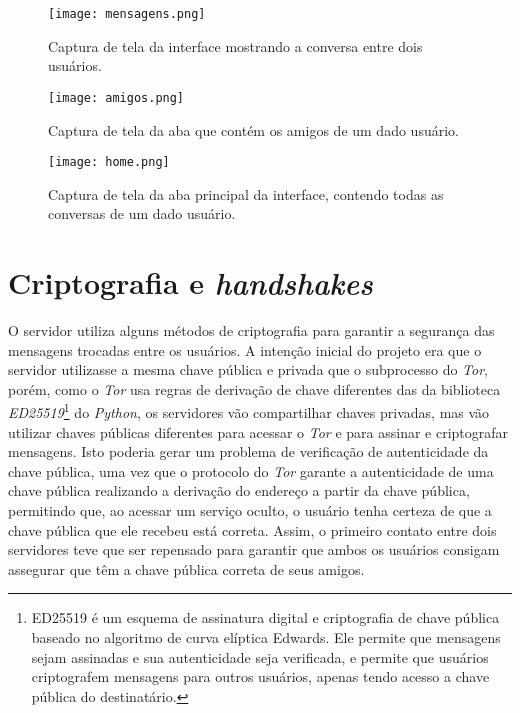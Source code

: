 \begin{figure}[H]
    \centering
    \texttt{[image: mensagens.png]}
    \caption{Captura de tela da interface mostrando a conversa entre dois usuários.}
    \label{fig:mensagens}
\end{figure}

\begin{figure}[H]
    \centering
    \texttt{[image: amigos.png]}
    \caption{Captura de tela da aba que contém os amigos de um dado usuário.}
    \label{fig:amigos}
\end{figure}

\begin{figure}[H]
    \centering
    \texttt{[image: home.png]}
    \caption{Captura de tela da aba principal da interface, contendo todas as conversas de um dado usuário.}
    \label{fig:home}
\end{figure}

\section{Criptografia e \textit{handshakes}}

O servidor utiliza alguns métodos de criptografia para garantir a segurança das mensagens trocadas entre os usuários. A intenção inicial do projeto era que o servidor utilizasse a mesma chave pública e privada que o subprocesso do \textit{Tor}, porém, como o \textit{Tor} usa regras de derivação de chave diferentes das da biblioteca \textit{ED25519}\footnote{ED25519 é um esquema de assinatura digital e criptografia de chave pública baseado no algoritmo de curva elíptica Edwards. Ele permite que mensagens sejam assinadas e sua autenticidade seja verificada, e permite que usuários criptografem mensagens para outros usuários, apenas tendo acesso a chave pública do destinatário.} do \textit{Python}, os servidores vão compartilhar chaves privadas, mas vão utilizar chaves públicas diferentes para acessar o \textit{Tor} e para assinar e criptografar mensagens. Isto poderia gerar um problema de verificação de autenticidade da chave pública, uma vez que o protocolo do \textit{Tor} garante a autenticidade de uma chave pública realizando a derivação do endereço a partir da chave pública, permitindo que, ao acessar um serviço oculto, o usuário tenha certeza de que a chave pública que ele recebeu está correta. Assim, o primeiro contato entre dois servidores teve que ser repensado para garantir que ambos os usuários consigam assegurar que têm a chave pública correta de seus amigos.

